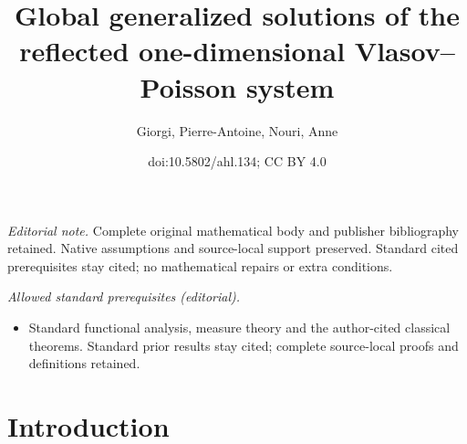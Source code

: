 \documentclass[10pt]{amsart}
\title{Global generalized solutions of the reflected one-dimensional Vlasov–Poisson system}
\author{Giorgi, Pierre-Antoine, Nouri, Anne}
\date{doi:10.5802/ahl.134; CC BY 4.0}
\theoremstyle{definition}\newtheorem{defi}[theo]{Definition}\newtheorem{rema}[theo]{Remark}\newtheorem{exam}[theo]{Example}\newtheorem{exem}[theo]{Example}\newtheorem{nota}[theo]{Notation}
\begin{document}
\maketitle
\noindent\textit{Editorial note.} Complete original mathematical body and publisher bibliography retained. Native assumptions and source-local support preserved. Standard cited prerequisites stay cited; no mathematical repairs or extra conditions.\par\medskip
\noindent\textit{Allowed standard prerequisites (editorial).}\begin{itemize}
\item Standard functional analysis, measure theory and the author-cited classical theorems. Standard prior results stay cited; complete source-local proofs and definitions retained.
\end{itemize}\medskip

\section{Introduction}\label{introduction}
\end{document}
